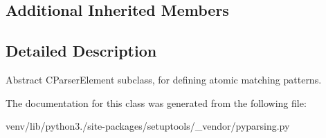 \subsection*{Additional Inherited Members}


\subsection{Detailed Description}
\begin{DoxyVerb}Abstract C{ParserElement} subclass, for defining atomic matching patterns.
\end{DoxyVerb}
 

The documentation for this class was generated from the following file\+:\begin{DoxyCompactItemize}
\item 
venv/lib/python3./site-\/packages/setuptools/\+\_\+vendor/pyparsing.\+py\end{DoxyCompactItemize}
